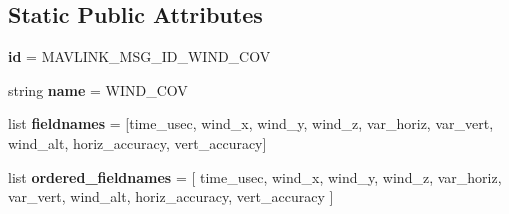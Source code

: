 \subsection*{Static Public Attributes}
\begin{DoxyCompactItemize}
\item 
\mbox{\label{classpymavlink_1_1dialects_1_1v10_1_1MAVLink__wind__cov__message_ae7cd4799cb63d6ccceb716aedc9cbb6d}} 
{\bfseries id} = M\+A\+V\+L\+I\+N\+K\+\_\+\+M\+S\+G\+\_\+\+I\+D\+\_\+\+W\+I\+N\+D\+\_\+\+C\+OV
\item 
\mbox{\label{classpymavlink_1_1dialects_1_1v10_1_1MAVLink__wind__cov__message_ac9232c87cc2f4b22fdba5e8c05bcd8d6}} 
string {\bfseries name} = \textquotesingle{}W\+I\+N\+D\+\_\+\+C\+OV\textquotesingle{}
\item 
\mbox{\label{classpymavlink_1_1dialects_1_1v10_1_1MAVLink__wind__cov__message_ab9be77318f2d5fbad0590cac6e4c1f18}} 
list {\bfseries fieldnames} = \mbox{[}\textquotesingle{}time\+\_\+usec\textquotesingle{}, \textquotesingle{}wind\+\_\+x\textquotesingle{}, \textquotesingle{}wind\+\_\+y\textquotesingle{}, \textquotesingle{}wind\+\_\+z\textquotesingle{}, \textquotesingle{}var\+\_\+horiz\textquotesingle{}, \textquotesingle{}var\+\_\+vert\textquotesingle{}, \textquotesingle{}wind\+\_\+alt\textquotesingle{}, \textquotesingle{}horiz\+\_\+accuracy\textquotesingle{}, \textquotesingle{}vert\+\_\+accuracy\textquotesingle{}\mbox{]}
\item 
\mbox{\label{classpymavlink_1_1dialects_1_1v10_1_1MAVLink__wind__cov__message_a26e53bdd08b800db6288859d558955cf}} 
list {\bfseries ordered\+\_\+fieldnames} = \mbox{[} \textquotesingle{}time\+\_\+usec\textquotesingle{}, \textquotesingle{}wind\+\_\+x\textquotesingle{}, \textquotesingle{}wind\+\_\+y\textquotesingle{}, \textquotesingle{}wind\+\_\+z\textquotesingle{}, \textquotesingle{}var\+\_\+horiz\textquotesingle{}, \textquotesingle{}var\+\_\+vert\textquotesingle{}, \textquotesingle{}wind\+\_\+alt\textquotesingle{}, \textquotesingle{}horiz\+\_\+accuracy\textquotesingle{}, \textquotesingle{}vert\+\_\+accuracy\textquotesingle{} \mbox{]}
\item 

\end{DoxyCompactItemize}
